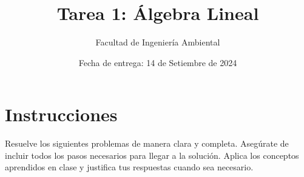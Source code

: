 \documentclass[10pt,a4paper]{article}
\title{Tarea 1: Álgebra Lineal}
\author{Facultad de Ingeniería Ambiental}
\date{Fecha de entrega: 14 de Setiembre de 2024}
\begin{document}
\maketitle
\centerline{\underline{\hspace{7in}}}
\section*{Instrucciones}
Resuelve los siguientes problemas de manera clara y completa. Asegúrate de incluir todos los pasos necesarios para llegar a la solución. Aplica los conceptos aprendidos en clase y justifica tus respuestas cuando sea necesario.
\end{document}
